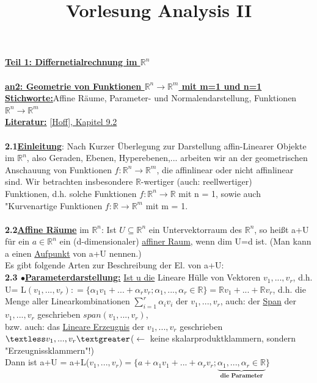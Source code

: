 \documentclass[]{scrartcl}
\title{Vorlesung Analysis II}
\begin{document}
\maketitle
\textbf{\underline{Teil 1: Differnetialrechnung im $\mathbb{R}^n$}}\\
\\
\textbf{\underline{an2: Geometrie von Funktionen 
$\mathbb{R}^n\rightarrow\mathbb{R}^m$ 
mit m=1 und n=1}}\\
\textbf{\underline{Stichworte:}}Affine Räume, Parameter- und 
Normalendarstellung, 
Funktionen 
$\mathbb{R}^n\rightarrow\mathbb{R}^m$\\
\textbf{\underline{Literatur:}} \ul{[Hoff], Kapitel 9.2}\\
\\
\textbf{2.1}\underline{\textbf{Einleitung}}: Nach Kurzer Überlegung zur 
Darstellung 
affin-Linearer Objekte im $\mathbb{R}^n$, also Geraden, Ebenen, Hyperebenen,... 
arbeiten wir an der geometrischen Anschauung von Funktionen 
$f:\mathbb{R}^n\rightarrow\mathbb{R}^m$, die affinlinear oder nicht affinlinear 
sind. Wir betrachten insbesondere $\mathbb{R}$-wertiger (auch: reellwertiger)\\
Funktionen, d.h. solche Funktionen $f:\mathbb{R}^n\rightarrow\mathbb{R}$ mit n 
= 1, sowie auch "Kurvenartige Funktionen $f: 
\mathbb{R}\rightarrow\mathbb{R}^m$ mit m = 1.\\\\
\textbf{2.2\underline{Affine Räume}} im $\mathbb{R}^n$: Ist 
$U\subseteq\mathbb{R}^n$ ein 
Untervektorraum des $\mathbb{R}^n$, so heißt a+U für ein $a\in \mathbb{R}^n$ 
ein (d-dimensionaler)  \ul{affiner Raum}, wenn dim U=d ist. 
(Man kann a einen \ul{Aufpunkt} von a+U nennen.)\\
Es gibt folgende Arten zur Beschreibung der El. von a+U:\\
\textbf{2.3 $\bullet$\underline{Parameterdarstellung:}} \ul{Ist u die} Lineare 
Hülle von 
Vektoren $v_1,...,v_r$, d.h. U= L$(v_1,...,v_r) : = \{\alpha_1 v_1+...+\alpha_r 
v_r; \alpha_1,...,\alpha_r\in\mathbb{R}\} = \mathbb{R}v_1+...+\mathbb{R}v_r$, 
d.h. die Menge aller Linearkombinationen $\sum_{i=1}^{r}\alpha_i v_i$ der 
$v_1,...,v_r$, auch: der \ul{Span} der $v_1,...,v_r$ geschrieben 
 \ul{$span(v_1,...,v_r)$},\\
bzw. auch: das  \ul{Lineare Erzeugnis} der $v_1,...,v_r$ 
geschrieben$\textless v_1,...,v_r\textgreater$($\leftarrow$ keine 
skalarproduktklammern, sondern "Erzeugnissklammern"!)\\
Dann ist a+U = a+L($v_1,...,v_r) = \{a+\alpha_1 v_1 +...+ \alpha_r v_r; 
\underbrace{\alpha_1,...,\alpha_r\in \mathbb{R}}_{\textbf{die Parameter}}\}$\\
\end{document}
